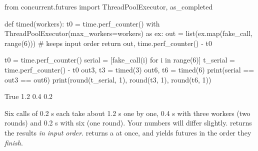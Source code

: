 \begin{center}
\end{center}

\begin{pycode}
from concurrent.futures import ThreadPoolExecutor, as_completed

def timed(workers):
    t0 = time.perf_counter()
    with ThreadPoolExecutor(max_workers=workers) as ex:
        out = list(ex.map(fake_call, range(6)))      # keeps input order
    return out, time.perf_counter() - t0

t0 = time.perf_counter()
serial = [fake_call(i) for i in range(6)]
t_serial = time.perf_counter() - t0
out3, t3 = timed(3)
out6, t6 = timed(6)
print(serial == out3 == out6)
print(round(t_serial, 1), round(t3, 1), round(t6, 1))
\end{pycode}
\begin{rawcode}
True
1.2 0.4 0.2
\end{rawcode}

Six calls of 0.2 s each take about 1.2 s one by one, 0.4 s with three workers (two rounds) and
0.2 s with six (one round). Your numbers will differ slightly.  returns the results
\emph{in input order}.  returns a  at once, and 
yields futures in the order they \emph{finish}.

